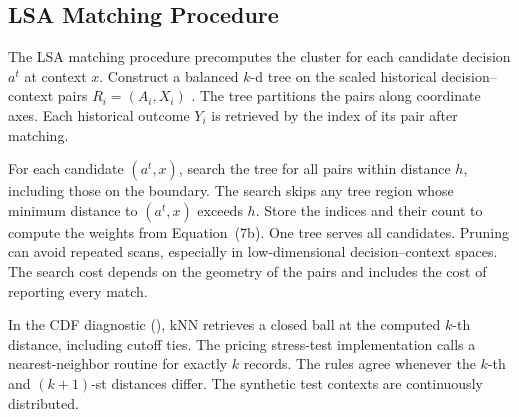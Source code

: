 \subsection{LSA Matching Procedure}\label{app::LSA}

The LSA matching procedure precomputes the cluster for each candidate decision \(a^t\) at context \(x\). Construct a balanced \(k\)-d tree on the scaled historical decision--context pairs \(R_i=(A_i,X_i)\) \citep{friedman1977algorithm}. The tree partitions the pairs along coordinate axes. Each historical outcome \(Y_i\) is retrieved by the index of its pair after matching.

For each candidate \((a^t,x)\), search the tree for all pairs within distance \(h\), including those on the boundary. The search skips any tree region whose minimum distance to \((a^t,x)\) exceeds \(h\). Store the indices and their count to compute the weights from Equation~\textup{(7b)}. One tree serves all candidates. Pruning can avoid repeated scans, especially in low-dimensional decision--context spaces. The search cost depends on the geometry of the pairs and includes the cost of reporting every match.


In the CDF diagnostic (), kNN retrieves a closed ball at the computed \(k\)-th distance, including cutoff ties. The pricing stress-test implementation calls a nearest-neighbor routine for exactly \(k\) records. The rules agree whenever the \(k\)-th and \((k+1)\)-st distances differ. The synthetic test contexts are continuously distributed.
